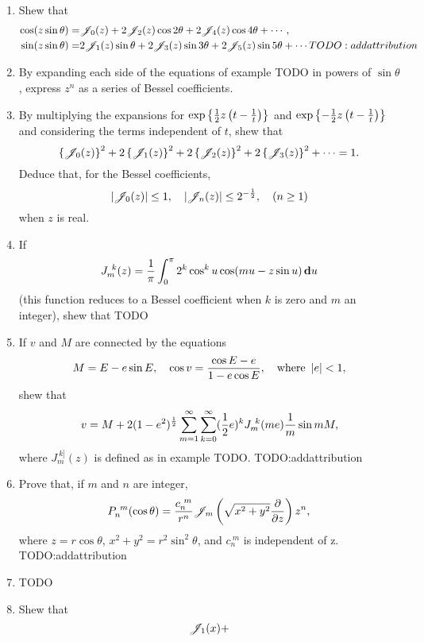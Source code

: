 \documentclass{book}
\begin{document}
%
%
\miscexamples
\begin{enumerate}
\item Shew that
  \begin{align*}
    \cos(z \sin\theta)
    =& \mathscr{J}_{0}(z) + 2 \mathscr{J}_{2}(z) \cos 2\theta + 2 \mathscr{J}_{4}(z)
    \cos 4\theta + \cdots,
    \\
    \sin(z\sin\theta)
    =& 2\mathscr{J}_{1}(z) \sin\theta + 2 \mathscr{J}_{3}(z)\sin 3\theta + 2
    \mathscr{J}_{5}(z) \sin 5\theta + \cdots
    TODO:addattribution
  \end{align*}
\item
  By expanding each side of the equations of example TODO in powers of
  $\sin\theta$, express $z^n$ as a series of Bessel coefficients.
\item
  By multiplying the expansions for
  $\exp{ \left\{  \frac{1}{2} z\left( t - \frac{1}{t} \right)  \right\}  }$
  and
  $\exp{ \left\{ - \frac{1}{2} z\left( t - \frac{1}{t} \right)  \right\}  }$
  and considering the terms independent of $t$, shew that
  $$
  \left\{  \mathscr{J}_{0}(z)  \right\}^2
  + 2 \left\{  \mathscr{J}_{1}(z)  \right\}^2
  + 2 \left\{  \mathscr{J}_{2}(z)  \right\}^2
  + 2 \left\{  \mathscr{J}_{3}(z)  \right\}^2
  +
  \cdots
  =
  1.
  $$
  Deduce that, for the Bessel coefficients,
  $$
  \left| \mathscr{J}_{0}(z) \right| \leq 1,
  \quad
  \left| \mathscr{J}_{n}(z) \right| \leq 2^{-\frac{1}{2}},
  \quad
  (n \geq 1)
  $$
  when $z$ is real.
\item
  If
  $$
  J_{m}^{\ k}(z)
  =
  \frac{1}{\pi}
  \int_{0}^{\pi}
  2^{k}
  \cos^{k} u
  \cos (mu - z\sin u)
  \, \mathbf{d} u
  $$
  (this function reduces to a Bessel coefficient when $k$ is zero and
  $m$ an integer), shew that
  TODO
\item
  If $v$ and $M$ are connected by the equations
  $$
  M = E - e \sin E,
  \quad
  \cos v = \frac{\cos E - e}{1 - e\cos E},
  \quad
  \text{where } \left| e \right| < 1,
  $$
  shew that
  $$
  v
  =
  M
  +
  2 (1-e^{2})^{\frac{1}{2}}
  \sum_{m=1}^{\infty}
  \sum_{k=0}^{\infty}
  (\frac{1}{2} e)^{k}
  J_{m}^{\ k}(me)
  \frac{1}{m}
  \sin mM,
  $$
  where $J_{m}^{\ k]}(z)$ is defined as in example TODO.
  TODO:addattribution
\item
  Prove that, if $m$ and $n$ are integer,
  $$
  P_{n}^{\ m}(\cos\theta)
  =
  \frac{c_{n}^{\ m}}{r^{n}}
  \mathscr{J}_{m}
  \left(  \sqrt{x^{2}+y^{2}} \frac{\partial}{\partial z} \right)
  z^{n},
  $$
  where $z = r\cos\theta$, $x^{2} + y^{2} = r^{2} \sin^{2}\theta$, and
  $c_{n}^{\ m}$ is independent of z.
  TODO:addattribution
\item
  TODO
\item
  Shew that
  $$
  \mathscr{J}_{1}(x)
  +
$$
\end{enumerate}
\end{document}
